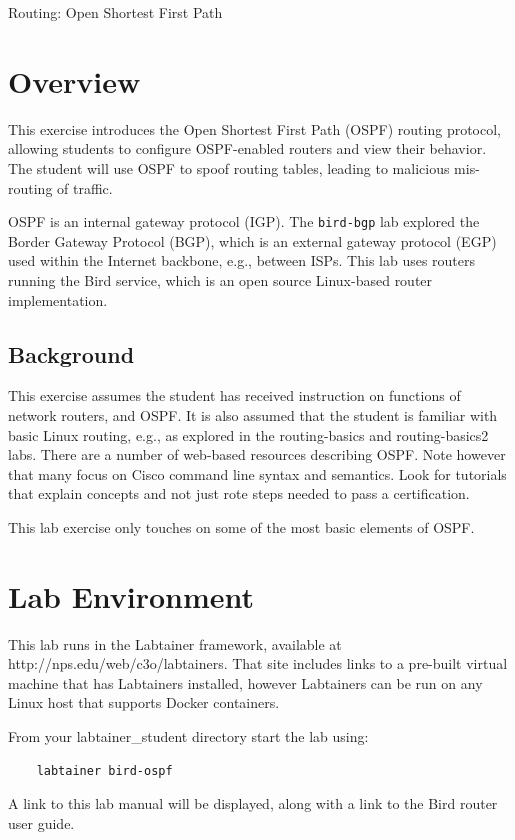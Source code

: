 


\begin{center}
{\LARGE Routing: Open Shortest First Path}
\vspace{0.1in}\\
\end{center}


\section{Overview}
This exercise introduces the Open Shortest First Path (OSPF) routing protocol,
allowing students to configure OSPF-enabled routers and view their behavior.
The student will use OSPF to spoof routing tables, leading to malicious mis-routing
of traffic.

OSPF is an internal gateway protocol (IGP).   The {\tt bird-bgp} lab explored the
Border Gateway Protocol (BGP), which is an external gateway protocol (EGP) used within the
Internet backbone, e.g., between ISPs.
This lab uses routers running the Bird service, which is an open source Linux-based router
implementation.

\subsection{Background}
This exercise assumes the student has received instruction on functions
of network routers, and OSPF.  
It is also assumed that the student is familiar with basic Linux routing, e.g., as explored in the
routing-basics and routing-basics2 labs.
There are a number of web-based resources describing OSPF.  Note however that many focus on Cisco
command line syntax and semantics.  Look for tutorials that explain concepts and not just rote 
steps needed to pass a certification.

This lab exercise only touches on some of the most basic elements of OSPF.

\section{Lab Environment}
This lab runs in the Labtainer framework,
available at http://nps.edu/web/c3o/labtainers.
That site includes links to a pre-built virtual machine
that has Labtainers installed, however Labtainers can
be run on any Linux host that supports Docker containers.

From your labtainer_student directory start the lab using:
\begin{verbatim}
    labtainer bird-ospf
\end{verbatim}
A link to this lab manual will be displayed, along with a link to the Bird router 
user guide.

